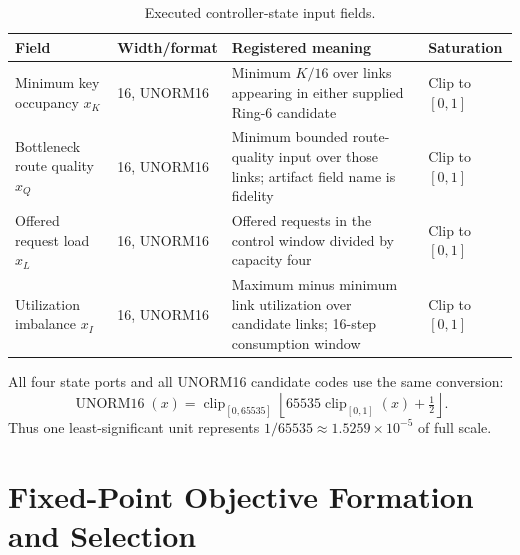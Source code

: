 \begin{table}[H]
\centering
\small
\caption{Executed controller-state input fields.}
\label{tab:state-input-fields}
\begin{tabularx}{\textwidth}{@{}p{}p{}p{}p{}@{}}
\toprule
\textbf{Field} & \textbf{Width/format} & \textbf{Registered meaning} &
\textbf{Saturation}\\
\midrule
Minimum key occupancy $x_K$ & 16, UNORM16 & Minimum $K/16$ over links appearing
in either supplied Ring-6 candidate & Clip to $[0,1]$\\
Bottleneck route quality $x_Q$ & 16, UNORM16 & Minimum bounded route-quality input
over those links; artifact field name is fidelity & Clip to $[0,1]$\\
Offered request load $x_L$ & 16, UNORM16 & Offered requests in the control window
divided by capacity four & Clip to $[0,1]$\\
Utilization imbalance $x_I$ & 16, UNORM16 & Maximum minus minimum link utilization
over candidate links; 16-step consumption window & Clip to $[0,1]$\\
\bottomrule
\end{tabularx}
\end{table}

All four state ports and all UNORM16 candidate codes use the same conversion:
\begin{equation}
\operatorname{UNORM16}(x)=
\operatorname{clip}_{[0,65535]}
\left\lfloor 65535\operatorname{clip}_{[0,1]}(x)+\tfrac12\right\rfloor.
\label{eq:unorm16}
\end{equation}
Thus one least-significant unit represents $1/65535\approx1.5259\times10^{-5}$
of full scale.

\section{Fixed-Point Objective Formation and Selection}

